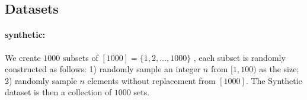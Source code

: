 \documentclass[11pt]{article}
\newcommand{\bbR}{\mathbb{R}}
\newcommand{\calK}{\mathcal{K}}
\DeclareMathOperator*{\argmax}{arg\,max}
\begin{document}





\subsection{Datasets}
\paragraph{synthetic:} We create $1000$ subsets of $[1000] = \{1, 2, \ldots, 1000\}$ , each subset is randomly constructed as follows: 1) randomly sample an integer $n$ from $[1, 100)$ as the size; 2) randomly sample $n$ elements without replacement from $[1000]$. The {\sc Synthetic } dataset is then a collection of $1000$ sets.
\end{document}
